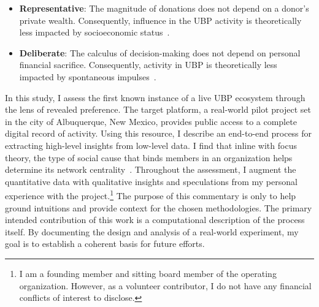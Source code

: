 \begin{itemize}
  \item \textbf{Representative}: The magnitude of donations does not depend on a donor's private wealth. Consequently, influence in the UBP activity is theoretically less impacted by socioeconomic status~\cite{james2007nature}.
  \item \textbf{Deliberate}: The calculus of decision-making does not depend on personal financial sacrifice. Consequently, activity in UBP is theoretically less impacted by spontaneous impulses~\cite{bennett2009impulsive}.
\end{itemize}

In this study, I assess the first known instance of a live UBP ecosystem through the lens of revealed preference.
The target platform, a real-world pilot project set in the city of Albuquerque, New Mexico, provides public access to a complete digital record of activity.
Using this resource, I describe an end-to-end process for extracting high-level insights from low-level data.
I find that inline with focus theory, the type of social cause that binds members in an organization helps determine its network centrality~\cite{feld1981focused}.
Throughout the assessment, I augment the quantitative data with qualitative insights and speculations from my personal experience with the project.\footnote{I am a founding member and sitting board member of the operating organization. However, as a volunteer contributor, I do not have any financial conflicts of interest to disclose.}
The purpose of this commentary is only to help ground intuitions and provide context for the chosen methodologies.
The primary intended contribution of this work is a computational description of the process itself.
By documenting the design and analysis of a real-world experiment, my goal is to establish a coherent basis for future efforts.
